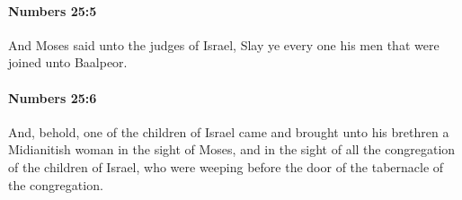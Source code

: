 		\paragraph{Numbers 25:5} %
			\label{NUMBERS-25-5}

			And Moses said unto the judges of Israel, Slay ye every one his men that were joined unto Baalpeor.


		\paragraph{Numbers 25:6} %
			\label{NUMBERS-25-6}

			And, behold, one of the children of Israel came and brought unto his brethren a Midianitish woman in the sight of Moses, and in the sight of all the congregation of the children of Israel, who were weeping before the door of the tabernacle of the congregation.


